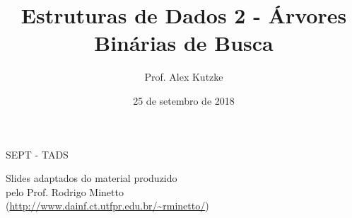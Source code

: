 \documentclass{beamer}
\title{Estruturas de Dados 2 - Árvores Binárias de Busca}
\author{Prof. Alex Kutzke}
\date{25 de setembro de 2018}
\begin{document}
	\begin{frame}
		\begin{center}
			\large{SEPT - TADS}
		\end{center}
		\titlepage
		\begin{center}
			Slides adaptados do material produzido\\pelo Prof. Rodrigo Minetto\\(\url{http://www.dainf.ct.utfpr.edu.br/~rminetto/})
		\end{center}
	\end{frame}
	
\end{document}
